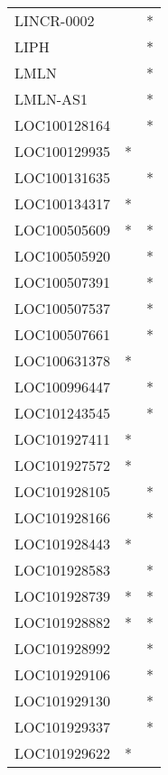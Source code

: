 \begin{longtable}{lcc}
LINCR-0002       &                &          * \\
LIPH             &                &          * \\
LMLN             &                &          * \\
LMLN-AS1         &                &          * \\
LOC100128164     &                &          * \\
LOC100129935     &              * &            \\
LOC100131635     &                &          * \\
LOC100134317     &              * &            \\
LOC100505609     &              * &          * \\
LOC100505920     &                &          * \\
LOC100507391     &                &          * \\
LOC100507537     &                &          * \\
LOC100507661     &                &          * \\
LOC100631378     &              * &            \\
LOC100996447     &                &          * \\
LOC101243545     &                &          * \\
LOC101927411     &              * &            \\
LOC101927572     &              * &            \\
LOC101928105     &                &          * \\
LOC101928166     &                &          * \\
LOC101928443     &              * &            \\
LOC101928583     &                &          * \\
LOC101928739     &              * &          * \\
LOC101928882     &              * &          * \\
LOC101928992     &                &          * \\
LOC101929106     &                &          * \\
LOC101929130     &                &          * \\
LOC101929337     &                &          * \\
LOC101929622     &              * &            \\

\end{longtable}

